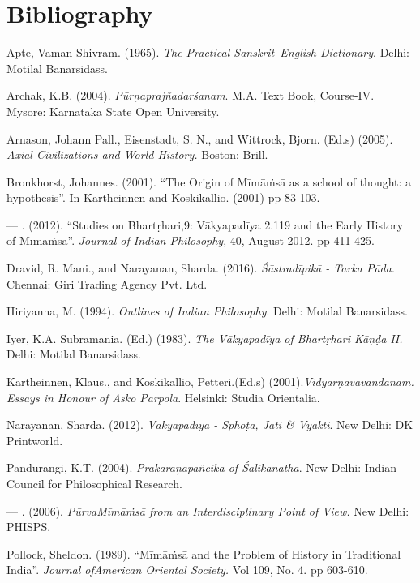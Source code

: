 \section*{Bibliography}

\begin{thebibliography}{99}
\itemsep=1pt
 Apte, Vaman Shivram. (1965). \textit{The Practical Sanskrit–English Dictionary}. Delhi: Motilal Banarsidass.

  Archak, K.B. (2004). \textit{Pūrṇaprajñadarśanam}. M.A. Text Book, Course-IV. Mysore: Karnataka State Open University.

  Arnason, Johann Pall., Eisenstadt, S. N., and Wittrock, Bjorn. (Ed.s) (2005). \textit{Axial Civilizations and World History.} Boston: Brill.

  Bronkhorst, Johannes. (2001). “The Origin of Mīmāṁsā as a school of thought: a hypothesis”. In Kartheinnen and Koskikallio. (2001) pp 83-103.

  — . (2012). “Studies on Bhartṛhari,9: Vākyapadīya 2.119 and the Early History of Mīmāṁsā”. \textit{Journal of Indian Philosophy}, 40, August 2012. pp 411-425.

  Dravid, R. Mani., and Narayanan, Sharda. (2016). \textit{Śāstradīpikā - Tarka Pāda}. Chennai: Giri Trading Agency Pvt. Ltd. 

  Hiriyanna, M. (1994). \textit{Outlines of Indian Philosophy}. Delhi: Motilal Banarsidass. 

  Iyer, K.A. Subramania. (Ed.) (1983). \textit{The Vākyapadīya of Bhartṛhari Kāṇḍa II.} Delhi: Motilal Banarsidass.

  Kartheinnen, Klaus., and Koskikallio, Petteri.(Ed.s) (2001).\textit{Vidyārņavavandanam. Essays in Honour of Asko Parpola}. Helsinki: Studia Orientalia.

  Narayanan, Sharda. (2012). \textit{Vākyapadīya - Sphoṭa, Jāti \& Vyakti}. New Delhi: DK Printworld. 

  Pandurangi, K.T. (2004). \textit{Prakaraņapañcikā of Śālikanātha}. New Delhi: Indian Council for Philosophical Research.

  — . (2006). \textit{PūrvaMīmāṁsā from an Interdisciplinary Point of View.} New Delhi: PHISPS. 

  Pollock, Sheldon. (1989). “Mīmāṁsā and the Problem of History in Traditional India”. \textit{Journal ofAmerican Oriental Society.} Vol 109, No. 4. pp 603-610.


\end{thebibliography}
